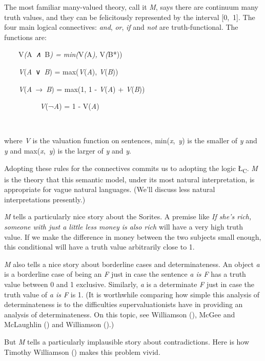 \documentclass[
  11pt,
  letterpaper,
  DIV=11,
  numbers=noendperiod,
  twoside]{scrartcl}
\begin{document}
The most familiar many-valued theory, call it \emph{M}, says there are
continuum many truth values, and they can be felicitously represented by
the interval {[}0,~1{]}. The four main logical connectives: \emph{and},
\emph{or}, \emph{if} and \emph{not} are truth-functional. The functions
are:

\hfill\break
~~~~\noindent *V\emph{(}A\emph{~∧~}B\emph{) = min(}V\emph{(}A\emph{),
}V\emph{(}B*))\\
\strut ~~~~\emph{V}(\emph{A}~∨~\emph{B}) = max(\emph{V}(\emph{A}),
\emph{V}(\emph{B}))\\
\strut ~~~~\emph{V}(\emph{A}~→~\emph{B}) = max(1, 1 - \emph{V}(\emph{A})
+ \emph{V}(\emph{B}))\\
\strut ~~~~~~~~~~\emph{V}(¬\emph{A}) = 1 - V(\emph{A})\\
\strut ~~~

\noindent where \emph{V} is the valuation function on sentences,
min(\emph{x},~\emph{y}) is the smaller of \emph{y} and \emph{y} and
max(\emph{x},~\emph{y}) is the larger of \emph{y} and \emph{y}.

Adopting these rules for the connectives commits us to adopting the
logic Ł\textsubscript{C}. \emph{M} is the theory that this semantic
model, under its most natural interpretation, is appropriate for vague
natural languages. (We'll discuss less natural interpretations
presently.)

\emph{M} tells a particularly nice story about the Sorites. A premise
like \emph{If she's rich, someone with just a little less money is also
rich} will have a very high truth value. If we make the difference in
money between the two subjects small enough, this conditional will have
a truth value arbitrarily close to 1.

\emph{M} also tells a nice story about borderline cases and
determinateness. An object \emph{a} is a borderline case of being an
\emph{F} just in case the sentence \emph{a is F} has a truth value
between 0 and 1 exclusive. Similarly, \emph{a} is a determinate \emph{F}
just in case the truth value of \emph{a is F} is 1. (It is worthwhile
comparing how simple this analysis of determinateness is to the
difficulties supervaluationists have in providing an analysis of
determinateness. On this topic, see Williamson
(), McGee and McLaughlin
() and Williamson
().)

But \emph{M} tells a particularly implausible story about
contradictions. Here is how Timothy Williamson
() makes this problem vivid.
\end{document}
